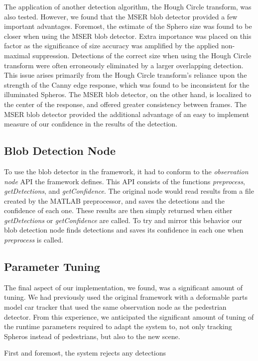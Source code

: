The application of another detection algorithm, the Hough Circle transform, was also tested. However, we found that the MSER
blob detector provided a few important advantages. Foremost, the estimate of the Sphero size was found to be closer when
using the MSER blob detector. Extra importance was placed on this factor as the significance of size accuracy was amplified by
the applied non-maximal suppression. Detections of the correct size when using the Hough Circle transform were often
erroneously eliminated by a larger overlapping detection. This issue arises primarily from the Hough Circle transform's reliance
upon the strength of the Canny edge response, which was found to be inconsistent for the illuminated Spheros. The MSER blob
detector, on the other hand, is localized to the center of the response, and offered greater consistency between frames. The
MSER blob detector provided the additional advantage of an easy to implement measure of our confidence in the results of the
detection.

\subsection{Blob Detection Node}
To use the blob detector in the framework, it had to conform to the \emph{observation node} API the framework defines. This API
consists of the functions \emph{preprocess}, \emph{getDetections}, and \emph{getConfidence}. The original node would read
results from a file created by the MATLAB preprocessor, and saves the detections and the confidence of each one.  These results
are then simply returned when either \emph{getDetections} or \emph{getConfidence} are called. To try and mirror this behavior
our blob detection node finds detections and saves its confidence in each one when \emph{preprocess} is called.

\subsection{Parameter Tuning}
The final aspect of our implementation, we found, was a significant amount of tuning. We had previously used the original
framework with a deformable parts model car tracker that used the same observation node as the pedestrian detector. From this
experience, we anticipated the significant amount of tuning of the runtime parameters required to adapt the system to, not only
tracking Spheros instead of pedestrians, but also to the new scene.

First and foremost, the system rejects any detections 